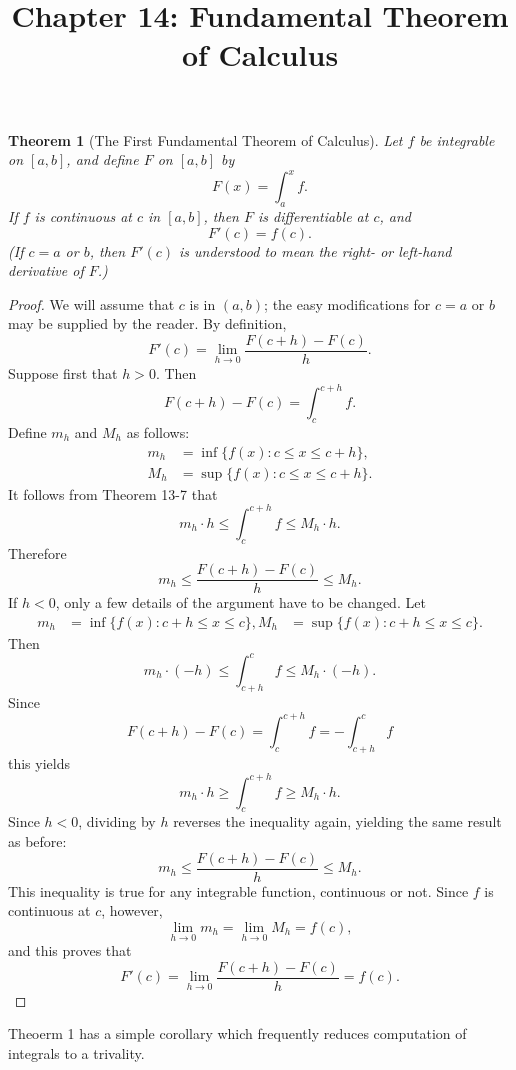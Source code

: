 \documentclass{article}
\newtheorem{theorem}{Theorem}
\begin{document}
\title{Chapter 14: Fundamental Theorem of Calculus}
\maketitle

\begin{theorem}[The First Fundamental Theorem of Calculus]
  Let $f$ be integrable on $[a, b]$, and define $F$ on $[a, b]$ by \[
    F(x) = \int_a^x f.
  \] If $f$ is continuous at $c$ in $[a, b]$, then $F$ is differentiable at
  $c$, and \[
    F'(c) = f(c).
  \] (If $c = a$ or $b$, then $F'(c)$ is understood to mean the right- or
  left-hand derivative of $F$.)
\end{theorem}
\begin{proof}
  We will assume that $c$ is in $(a, b)$; the easy modifications for $c = a$ or
  $b$ may be supplied by the reader. By definition, \[
    F'(c) = \lim_{h \to 0}\frac{F(c + h) - F(c)}{h}.
  \] Suppose first that $h > 0$. Then \[
    F(c + h) - F(c) = \int_c^{c + h} f.
  \] Define $m_h$ and $M_h$ as follows:
  \begin{align*}
    m_h &= \inf\{f(x): c \leq x \leq c + h\}, \\
    M_h &= \sup\{f(x): c \leq x \leq c + h\}.
  \end{align*}
  It follows from Theorem 13-7 that \[
    m_h \cdot h \leq \int_c^{c + h} f \leq M_h \cdot h.
  \] Therefore \[
    m_h \leq \frac{F(c + h) - F(c)}{h} \leq M_h.
  \] If $h < 0$, only a few details of the argument have to be changed. Let
  \begin{align*}
    m_h &= \inf\{f(x): c + h \leq x \leq c\},
    M_h &= \sup\{f(x): c + h \leq x \leq c\}.
  \end{align*}
  Then \[
    m_h \cdot (-h) \leq \int_{c + h}^c f \leq M_h \cdot (-h).
  \] Since \[
    F(c + h) - F(c) = \int_c^{c + h} f = -\int_{c + h}^c f
  \] this yields \[
    m_h \cdot h \geq \int_c^{c + h} f \geq M_h \cdot h.
  \] Since $h < 0$, dividing by $h$ reverses the inequality again, yielding the
  same result as before: \[
    m_h \leq \frac{F(c + h) - F(c)}{h} \leq M_h.
  \] This inequality is true for any integrable function, continuous or not.
  Since $f$ is continuous at $c$, however, \[
    \lim_{h \to 0} m_h = \lim_{h \to 0} M_h = f(c),
  \] and this proves that \[
    F'(c) = \lim_{h \to 0} \frac{F(c + h) - F(c)}{h} = f(c).
  \]
\end{proof}

Theoerm 1 has a simple corollary which frequently reduces computation of
integrals to a trivality.
\end{document}
